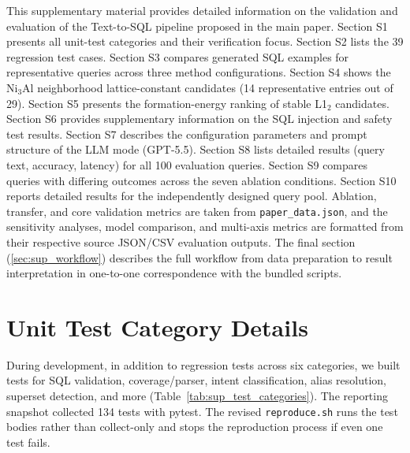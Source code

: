 \noindent
This supplementary material provides detailed information on the validation and evaluation of the Text-to-SQL pipeline proposed in the main paper. Section S1 presents all unit-test categories and their verification focus. Section S2 lists the 39 regression test cases. Section S3 compares generated SQL examples for representative queries across three method configurations. Section S4 shows the Ni$_3$Al neighborhood lattice-constant candidates (14 representative entries out of 29). Section S5 presents the formation-energy ranking of stable L1$_2$ candidates. Section S6 provides supplementary information on the SQL injection and safety test results. Section S7 describes the configuration parameters and prompt structure of the LLM mode (GPT-5.5). Section S8 lists detailed results (query text, accuracy, latency) for all 100 evaluation queries. Section S9 compares queries with differing outcomes across the seven ablation conditions. Section S10 reports detailed results for the independently designed query pool. Ablation, transfer, and core validation metrics are taken from \texttt{paper\_data.json}, and the sensitivity analyses, model comparison, and multi-axis metrics are formatted from their respective source JSON/CSV evaluation outputs. The final section (\ref{sec:sup_workflow}) describes the full workflow from data preparation to result interpretation in one-to-one correspondence with the bundled scripts.


\section{Unit Test Category Details}

\label{sec:sup_test_categories}

During development, in addition to regression tests across six categories, we built tests for SQL validation, coverage/parser, intent classification, alias resolution, superset detection, and more (Table~\ref{tab:sup_test_categories}). The reporting snapshot collected 134 tests with pytest. The revised \texttt{reproduce.sh} runs the test bodies rather than collect-only and stops the reproduction process if even one test fails.

